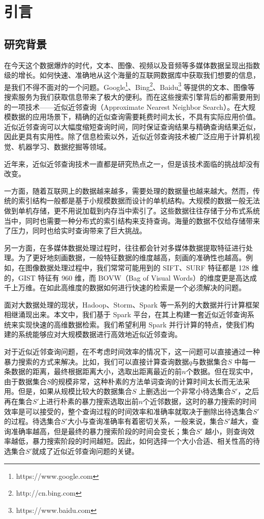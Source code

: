 

\chapter{引言}
\label{cha:introdction}

\section{研究背景}
在今天这个数据爆炸的时代，文本、图像、视频以及音频等多媒体数据呈现出指数级的增长。如何快速、准确地从这个海量的互联网数据库中获取我们想要的信息，是我们不得不面对的一个问题。Google\footnote{https://www.google.com}、Bing\footnote{http://cn.bing.com}、Baidu\footnote{https://www.baidu.com} 等提供的文本、图像等搜索服务为我们获取信息带来了极大的便利。而在这些搜索引擎背后的都需要用到的一项技术——近似近邻查询（Approximate Nearest Neighbor Search）。在大规模数据的应用场景下，精确的近似查询需要耗费时间太长，不具有实际应用价值。近似近邻查询可以大幅度缩短查询时间，同时保证查询结果与精确查询结果近似，因此更具有实用性。除了信息检索以外，近似近邻查询技术被广泛应用于计算机视觉、机器学习、数据挖掘等领域。

近年来，近似近邻查询技术一直都是研究热点之一，但是该技术面临的挑战却没有改变。

一方面，随着互联网上的数据越来越多，需要处理的数据量也越来越大。然而，传统的索引结构一般都是基于小规模数据而设计的单机结构。大规模的数据一般无法做到单机存储，更不用说加载到内存当中索引了。这些数据往往存储于分布式系统当中，同时也需要一种分布式的索引结构来支持查询。海量的数据不仅给存储带来了压力，同时也给实时查询带来了巨大挑战。

另一方面，在多媒体数据处理过程时，往往都会针对多媒体数据提取特征进行处理。为了更好地刻画数据，一般特征数据的维度越高，刻画的准确性也越高。例如，在图像数据处理过程中，我们常常可能用到的 SIFT、SURF 特征都是 128 维的，GIST 特征有 960 维，而 BOVW（Bag of Visual Words）的维度更是高达成千上万维。在如此高维度的数据如何进行快速的检索是一个必须解决的问题。

面对大数据处理的现状，Hadoop、Storm、Spark 等一系列的大数据并行计算框架相继涌现出来。本文中，我们基于 Spark 平台，在其上构建一套近似近邻查询系统来实现快速的高维数据检索。我们希望利用 Spark 并行计算的特点，使我们构建的系统能够应对大规模数据进行高效地近似近邻查询。

对于近似近邻查询问题，在不考虑时间效率的情况下，这一问题可以直接通过一种暴力搜索的方式来解决。比如，我们可以直接计算查询数据$q$与数据集合$S$ 中每一条数据的距离，最终根据距离大小，选取出距离最近的前$n$个数据。但在现实中，由于数据集合$S$的规模非常，这种朴素的方法单词查询的计算时间太长而无法采用。但是，如果从规模比较大的数据集合$S$ 上删选出一个非常小待选集合$S'$，之后再在集合$S'$上进行朴素的暴力搜索选取出前$n$个近邻数据，这时的暴力搜索的时间效率是可以接受的，整个查询过程的时间效率和准确率就取决于删除出待选集合$S'$的过程。待选集合$S'$大小与查询准确率有着密切关系，一般来说，集合$S'$越大，查询准确率越高，但是最终的暴力搜索阶段的时间会变长；集合$S'$ 越小，则查询效率越低，暴力搜索阶段的时间越短。因此，如何选择一个大小合适、相关性高的待选集合$S'$就成了近似近邻查询问题的关键。

